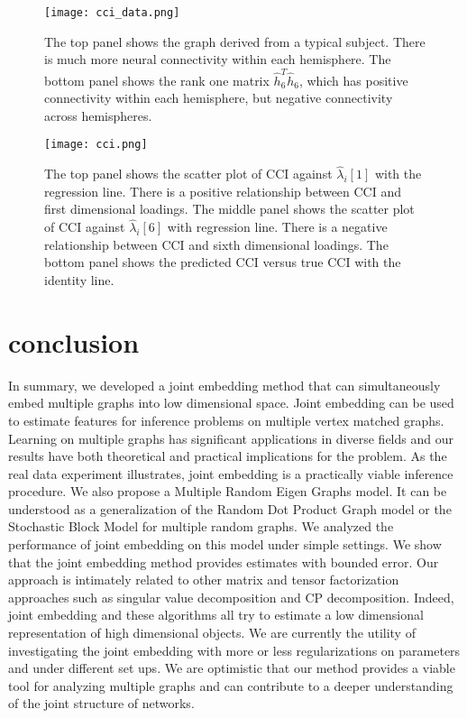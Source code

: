 \documentclass[10pt,journal,compsoc]{IEEEtran}
\begin{document}
\begin{figure}[!htbp]
	\centering
	\texttt{[image: cci\_data.png]}
	\caption{The top panel shows the graph derived from a typical subject. There is much more neural connectivity within each hemisphere. The bottom panel shows the rank one matrix $\hat{h}_6^T\hat{h}_6$, which has positive  connectivity within each hemisphere, but negative  connectivity across hemispheres.  }
	\label{fig:cci1}
\end{figure} 

\begin{figure}[!htbp]
	\centering
	\texttt{[image: cci.png]}
	\caption{The top panel shows the scatter plot of CCI against $\hat{\lambda}_i[1]$ with the regression line. There is a positive relationship between CCI and first dimensional loadings. The middle panel shows the scatter plot of CCI against $\hat{\lambda}_i[6]$ with regression line. There is a negative relationship between CCI and sixth dimensional loadings. The bottom panel shows the predicted CCI versus true CCI with the identity line.}
	\label{fig:cci}
\end{figure}


\section{conclusion}
In summary, we developed a joint embedding method that can simultaneously embed multiple graphs into low dimensional space. Joint embedding can be used to estimate features for inference problems on multiple vertex matched graphs. Learning on multiple graphs has significant applications in diverse fields and our results have both theoretical and practical implications for the problem. As the real data experiment illustrates, joint embedding is a practically viable inference procedure. We also propose a Multiple Random Eigen Graphs model. It can be understood as a generalization of the Random Dot Product Graph model or the Stochastic Block Model for multiple random graphs. We analyzed the performance of joint embedding on this model under simple settings. We show that the joint embedding method provides estimates with bounded error. Our approach is intimately related to other matrix and tensor factorization approaches such as singular value decomposition and CP decomposition. Indeed, joint embedding and these algorithms all try to estimate a low dimensional representation of high dimensional objects. We are currently the utility of investigating the joint embedding with more or less regularizations on parameters and under different set ups. We are optimistic that our method provides a viable tool for analyzing multiple graphs and can contribute to a deeper understanding of the joint structure of networks.
\end{document}
